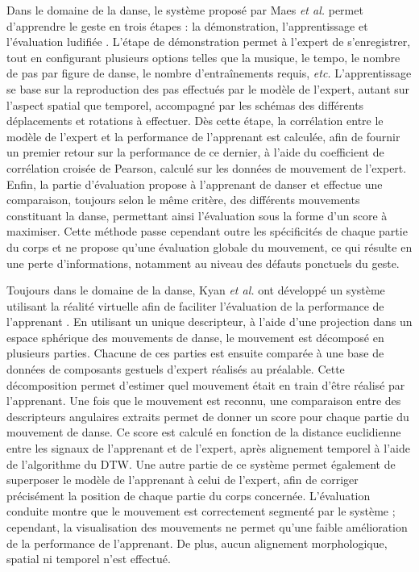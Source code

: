 Dans le domaine de la danse, le système proposé par Maes \textit{et al.} permet d'apprendre le geste en trois étapes : la démonstration, l'apprentissage et l'évaluation ludifiée \parencite{Maes2012DtM}. L'étape de démonstration permet à l'expert de s'enregistrer, tout en configurant plusieurs options telles que la musique, le tempo, le nombre de pas par figure de danse, le nombre d'entraînements requis, \textit{etc.} L'apprentissage se base sur la reproduction des pas effectués par le modèle de l'expert, autant sur l'aspect spatial que temporel, accompagné par les schémas des différents déplacements et rotations à effectuer. Dès cette étape, la corrélation entre le modèle de l'expert et la performance de l'apprenant est calculée, afin de fournir un premier retour sur la performance de ce dernier, à l'aide du coefficient de corrélation croisée de Pearson, calculé sur les données de mouvement de l'expert. Enfin, la partie d'évaluation propose à l'apprenant de danser et effectue une comparaison, toujours selon le même critère, des différents mouvements constituant la danse, permettant ainsi l'évaluation sous la forme d'un score à maximiser. Cette méthode passe cependant outre les spécificités de chaque partie du corps et ne propose qu'une évaluation globale du mouvement, ce qui résulte en une perte d'informations, notamment au niveau des défauts ponctuels du geste.

Toujours dans le domaine de la danse, Kyan \textit{et al.} ont développé un système utilisant la réalité virtuelle afin de faciliter l'évaluation de la performance de l'apprenant \parencite{Kyan2015ABD}. En utilisant un unique descripteur, à l'aide d'une projection dans un espace sphérique des mouvements de danse, le mouvement est décomposé en plusieurs parties. Chacune de ces parties est ensuite comparée à une base de données de composants gestuels d'expert réalisés au préalable. Cette décomposition permet d'estimer quel mouvement était en train d'être réalisé par l'apprenant. Une fois que le mouvement est reconnu, une comparaison entre des descripteurs angulaires extraits permet de donner un score pour chaque partie du mouvement de danse. Ce score est calculé en fonction de la distance euclidienne entre les signaux de l'apprenant et de l'expert, après alignement temporel à l'aide de l'algorithme du DTW. Une autre partie de ce système permet également de superposer le modèle de l'apprenant à celui de l'expert, afin de corriger précisément la position de chaque partie du corps concernée. L'évaluation conduite montre que le mouvement est correctement segmenté par le système ; cependant, la visualisation des mouvements ne permet qu'une faible amélioration de la performance de l'apprenant. De plus, aucun alignement morphologique, spatial ni temporel n'est effectué.

